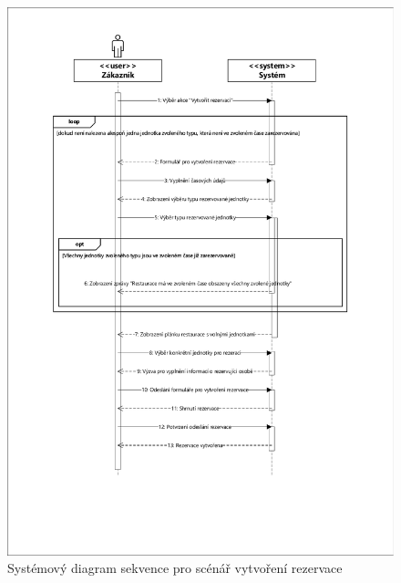\newpage
\begin{figure}[h!]
\begin{center}
\includegraphics[scale=0.85]{../02_Vysledne_modely/04_1_SystemSequence_CreateReservation.pdf}
\caption{Systémový diagram sekvence pro scénář vytvoření rezervace}
\label{fig:communication09-1}
\end{center}
\end{figure}


